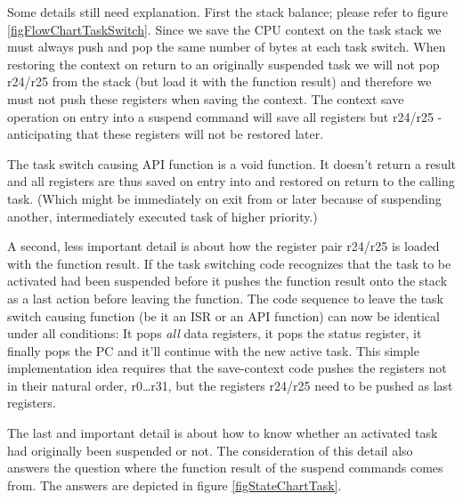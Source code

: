 Some details still need explanation. First the stack balance; please refer
to figure \ref{figFlowChartTaskSwitch}. Since we save the CPU context on
the task stack we must always push and pop the same number of bytes at
each task switch. When restoring the context on return to an originally
suspended task we will not pop r24/r25 from the stack (but load it with
the function result) and therefore we must not push these registers when
saving the context. The context save operation on entry into a suspend
command will save all registers but r24/r25 - anticipating that these
registers will not be restored later.


The task switch causing API function  is a void
function. It doesn't return a result and all registers are thus saved on
entry into  and restored on return to the calling
task. (Which might be immediately on exit from  or
later because of suspending another, intermediately executed task of
higher priority.)

A second, less important detail is about how the register pair r24/r25 is
loaded with the function result. If the task switching code recognizes
that the task to be activated had been suspended before it pushes the
function result onto the stack as a last action before leaving the
function. The code sequence to leave the task switch causing function (be
it an ISR or an API function) can now be identical under all conditions: It
pops \emph{all} data registers, it pops the status register, it finally
pops the PC and it'll continue with the new active task. This simple
implementation idea requires that the save-context code pushes the
registers not in their natural order, r0\ldots r31, but the registers
r24/r25 need to be pushed as last registers.

The last and important detail is about how to know whether an activated
task had originally been suspended or not. The consideration of this
detail also answers the question where the function result of the suspend
commands comes from. The answers are depicted in figure
\ref{figStateChartTask}.

